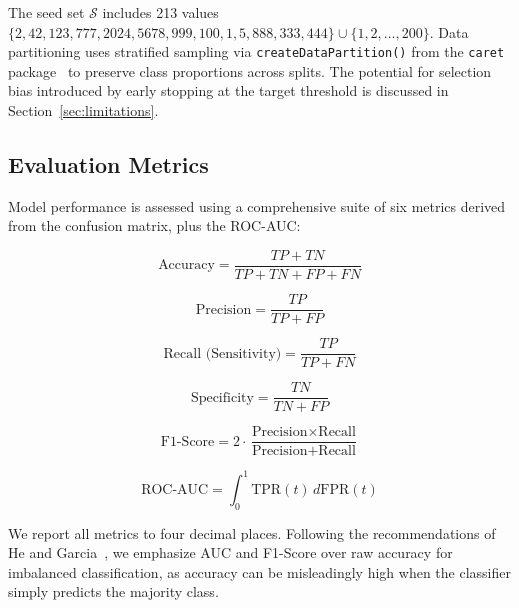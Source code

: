 \documentclass[10pt, conference, letterpaper]{IEEEtran}
\begin{document}
The seed set $\mathcal{S}$ includes 213 values $\{2, 42, 123, 777, 2024, 5678, 999, 100, 1, 5, 888, 333, 444\} \cup \{1, 2, \ldots, 200\}$. Data partitioning uses stratified sampling via \texttt{createDataPartition()} from the \texttt{caret} package~\cite{kuhn2008caret} to preserve class proportions across splits. The potential for selection bias introduced by early stopping at the target threshold is discussed in Section~\ref{sec:limitations}.

\subsection{Evaluation Metrics}
\label{subsec:metrics}

Model performance is assessed using a comprehensive suite of six metrics derived from the confusion matrix, plus the ROC-AUC:

\begin{equation}
\text{Accuracy} = \frac{TP + TN}{TP + TN + FP + FN}
\label{eq:accuracy}
\end{equation}

\begin{equation}
\text{Precision} = \frac{TP}{TP + FP}
\label{eq:precision}
\end{equation}

\begin{equation}
\text{Recall (Sensitivity)} = \frac{TP}{TP + FN}
\label{eq:recall}
\end{equation}

\begin{equation}
\text{Specificity} = \frac{TN}{TN + FP}
\label{eq:specificity}
\end{equation}

\begin{equation}
\text{F1-Score} = 2 \cdot \frac{\text{Precision} \times \text{Recall}}{\text{Precision} + \text{Recall}}
\label{eq:f1}
\end{equation}

\begin{equation}
\text{ROC-AUC} = \int_0^1 \text{TPR}(t) \, d\text{FPR}(t)
\label{eq:auc}
\end{equation}

We report all metrics to four decimal places. Following the recommendations of He and Garcia~\cite{he2009imbalanced}, we emphasize AUC and F1-Score over raw accuracy for imbalanced classification, as accuracy can be misleadingly high when the classifier simply predicts the majority class.
\end{document}
